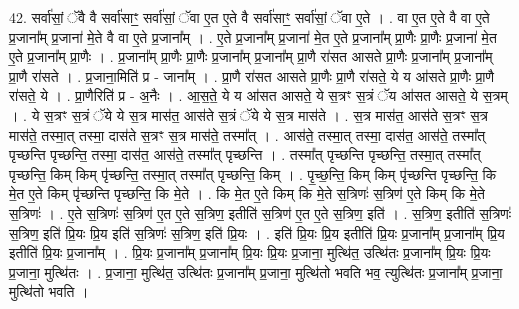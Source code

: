 \documentclass[17pt]{extarticle}
\begin{document}
42. सर्वा॑सां॒ ॅवै वै सर्वा॑साꣳ॒॒ सर्वा॑सां॒ ॅवा ए॒त ए॒ते वै सर्वा॑साꣳ॒॒ सर्वा॑सां॒ ॅवा ए॒ते । . वा ए॒त ए॒ते वै वा ए॒ते प्र॒जाना᳚म् प्र॒जाना॑ मे॒ते वै वा ए॒ते प्र॒जाना᳚म् । . ए॒ते प्र॒जाना᳚म् प्र॒जाना॑ मे॒त ए॒ते प्र॒जाना᳚म् प्रा॒णैः प्रा॒णैः प्र॒जाना॑ मे॒त ए॒ते प्र॒जाना᳚म् प्रा॒णैः । . प्र॒जाना᳚म् प्रा॒णैः प्रा॒णैः प्र॒जाना᳚म् प्र॒जाना᳚म् प्रा॒णै रा॑सत आसते प्रा॒णैः प्र॒जाना᳚म् प्र॒जाना᳚म् प्रा॒णै रा॑सते । . प्र॒जाना॒मिति॑ प्र - जाना᳚म् । . प्रा॒णै रा॑सत आसते प्रा॒णैः प्रा॒णै रा॑सते॒ ये य आ॑सते प्रा॒णैः प्रा॒णै रा॑सते॒ ये । . प्रा॒णैरिति॑ प्र - अ॒नैः । . आ॒स॒ते॒ ये य आ॑सत आसते॒ ये स॒त्रꣳ स॒त्रं ॅय आ॑सत आसते॒ ये स॒त्रम् । . ये स॒त्रꣳ स॒त्रं ॅये ये स॒त्र मास॑त॒ आस॑ते स॒त्रं ॅये ये स॒त्र मास॑ते । . स॒त्र मास॑त॒ आस॑ते स॒त्रꣳ स॒त्र मास॑ते॒ तस्मा॒त् तस्मा॒ दास॑ते स॒त्रꣳ स॒त्र मास॑ते॒ तस्मा᳚त् । . आस॑ते॒ तस्मा॒त् तस्मा॒ दास॑त॒ आस॑ते॒ तस्मा᳚त् पृच्छन्ति पृच्छन्ति॒ तस्मा॒ दास॑त॒ आस॑ते॒ तस्मा᳚त् पृच्छन्ति । . तस्मा᳚त् पृच्छन्ति पृच्छन्ति॒ तस्मा॒त् तस्मा᳚त् पृच्छन्ति॒ किम् किम् पृ॑च्छन्ति॒ तस्मा॒त् तस्मा᳚त् पृच्छन्ति॒ किम् । . पृ॒च्छ॒न्ति॒ किम् किम् पृ॑च्छन्ति पृच्छन्ति॒ कि मे॒त ए॒ते किम् पृ॑च्छन्ति पृच्छन्ति॒ कि मे॒ते । . कि मे॒त ए॒ते किम् कि मे॒ते स॒त्रिणः॑ स॒त्रिण॑ ए॒ते किम् कि मे॒ते स॒त्रिणः॑ । . ए॒ते स॒त्रिणः॑ स॒त्रिण॑ ए॒त ए॒ते स॒त्रिण॒ इतीति॑ स॒त्रिण॑ ए॒त ए॒ते स॒त्रिण॒ इति॑ । . स॒त्रिण॒ इतीति॑ स॒त्रिणः॑ स॒त्रिण॒ इति॑ प्रि॒यः प्रि॒य इति॑ स॒त्रिणः॑ स॒त्रिण॒ इति॑ प्रि॒यः । . इति॑ प्रि॒यः प्रि॒य इतीति॑ प्रि॒यः प्र॒जाना᳚म् प्र॒जाना᳚म् प्रि॒य इतीति॑ प्रि॒यः प्र॒जाना᳚म् । . प्रि॒यः प्र॒जाना᳚म् प्र॒जाना᳚म् प्रि॒यः प्रि॒यः प्र॒जाना॒ मुत्थि॑त॒ उत्थि॑तः प्र॒जाना᳚म् प्रि॒यः प्रि॒यः प्र॒जाना॒ मुत्थि॑तः । . प्र॒जाना॒ मुत्थि॑त॒ उत्थि॑तः प्र॒जाना᳚म् प्र॒जाना॒ मुत्थि॑तो भवति भव॒ त्युत्थि॑तः प्र॒जाना᳚म् प्र॒जाना॒ मुत्थि॑तो भवति । \newline
\end{document}
